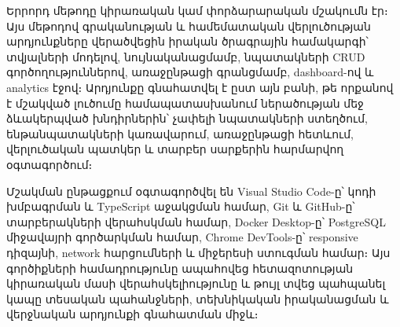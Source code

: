 Երրորդ մեթոդը կիրառական կամ փորձարարական մշակումն էր։ Այս մեթոդով գրականության և համեմատական վերլուծության արդյունքները վերածվեցին իրական ծրագրային համակարգի՝ տվյալների մոդելով, նույնականացմամբ, նպատակների CRUD գործողություններով, առաջընթացի գրանցմամբ, dashboard-ով և analytics էջով։ Արդյունքը գնահատվել է ըստ այն բանի, թե որքանով է մշակված լուծումը համապատասխանում ներածության մեջ ձևակերպված խնդիրներին՝ չափելի նպատակների ստեղծում, ենթանպատակների կառավարում, առաջընթացի հետևում, վերլուծական պատկեր և տարբեր սարքերին հարմարվող օգտագործում։

Մշակման ընթացքում օգտագործվել են Visual Studio Code-ը՝ կոդի խմբագրման և TypeScript աջակցման համար, Git և GitHub-ը՝ տարբերակների վերահսկման համար, Docker Desktop-ը՝ PostgreSQL միջավայրի գործարկման համար, Chrome DevTools-ը՝ responsive դիզայնի, network հարցումների և միջերեսի ստուգման համար։ Այս գործիքների համադրությունը ապահովեց հետազոտության կիրառական մասի վերահսկելիությունը և թույլ տվեց պահպանել կապը տեսական պահանջների, տեխնիկական իրականացման և վերջնական արդյունքի գնահատման միջև։

\fussy
